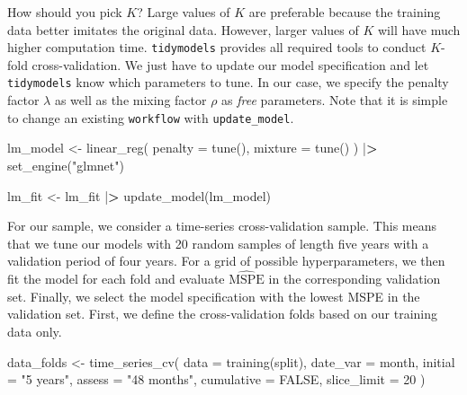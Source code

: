 \documentclass[
]{book}
\newenvironment{Shaded}{\begin{snugshade}}{\end{snugshade}}
\newcommand{\AttributeTok}[1]{\textcolor[rgb]{0.61,0.61,0.61}{#1}}
\newcommand{\ConstantTok}[1]{\textcolor[rgb]{0,0,0}{#1}}
\newcommand{\DecValTok}[1]{\textcolor[rgb]{0.06,0.06,0.06}{#1}}
\newcommand{\ErrorTok}[1]{\textcolor[rgb]{0.14,0.14,0.14}{\textbf{#1}}}
\newcommand{\FunctionTok}[1]{\textcolor[rgb]{0,0,0}{#1}}
\newcommand{\NormalTok}[1]{#1}
\newcommand{\OtherTok}[1]{\textcolor[rgb]{0.37,0.37,0.37}{#1}}
\newcommand{\SpecialCharTok}[1]{\textcolor[rgb]{0,0,0}{#1}}
\newcommand{\StringTok}[1]{\textcolor[rgb]{0.5,0.5,0.5}{#1}}
\begin{document}
How should you pick \(K\)? Large values of \(K\) are preferable because the training data better imitates the original data. However, larger values of \(K\) will have much higher computation time.
\texttt{tidymodels} provides all required tools to conduct \(K\)-fold cross-validation. We just have to update our model specification and let \texttt{tidymodels} know which parameters to tune. In our case, we specify the penalty factor \(\lambda\) as well as the mixing factor \(\rho\) as \emph{free} parameters. Note that it is simple to change an existing \texttt{workflow} with \texttt{update\_model}.

\begin{Shaded}
\begin{Highlighting}[]
\NormalTok{lm\_model }\OtherTok{\textless{}{-}} \FunctionTok{linear\_reg}\NormalTok{(}
  \AttributeTok{penalty =} \FunctionTok{tune}\NormalTok{(),}
  \AttributeTok{mixture =} \FunctionTok{tune}\NormalTok{()}
\NormalTok{) }\SpecialCharTok{|}\ErrorTok{\textgreater{}}
  \FunctionTok{set\_engine}\NormalTok{(}\StringTok{"glmnet"}\NormalTok{)}

\NormalTok{lm\_fit }\OtherTok{\textless{}{-}}\NormalTok{ lm\_fit }\SpecialCharTok{|}\ErrorTok{\textgreater{}}
  \FunctionTok{update\_model}\NormalTok{(lm\_model)}
\end{Highlighting}
\end{Shaded}

For our sample, we consider a time-series cross-validation sample. This means that we tune our models with 20 random samples of length five years with a validation period of four years. For a grid of possible hyperparameters, we then fit the model for each fold and evaluate \(\hat{\text{MSPE}}\) in the corresponding validation set. Finally, we select the model specification with the lowest MSPE in the validation set. First, we define the cross-validation folds based on our training data only.

\begin{Shaded}
\begin{Highlighting}[]
\NormalTok{data\_folds }\OtherTok{\textless{}{-}} \FunctionTok{time\_series\_cv}\NormalTok{(}
  \AttributeTok{data        =} \FunctionTok{training}\NormalTok{(split),}
  \AttributeTok{date\_var    =}\NormalTok{ month,}
  \AttributeTok{initial     =} \StringTok{"5 years"}\NormalTok{,}
  \AttributeTok{assess      =} \StringTok{"48 months"}\NormalTok{,}
  \AttributeTok{cumulative  =} \ConstantTok{FALSE}\NormalTok{,}
  \AttributeTok{slice\_limit =} \DecValTok{20}
\NormalTok{)}
\end{Highlighting}
\end{Shaded}
\end{document}
